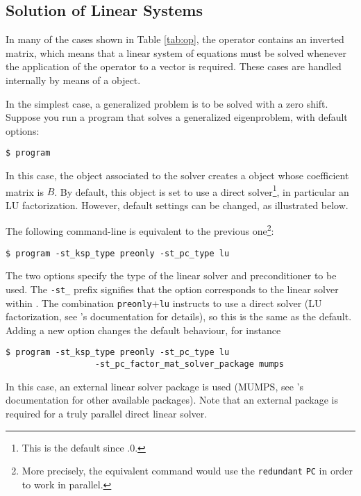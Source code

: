 \subsection{Solution of Linear Systems}
\label{sec:lin}

	In many of the cases shown in Table \ref{tab:op}, the operator contains an inverted matrix, which means that a linear system of equations must be solved whenever the application of the operator to a vector is required. These cases are handled internally by means of a  object.

	In the simplest case, a generalized problem is to be solved with a zero shift. Suppose you run a program that solves a generalized eigenproblem, with default options:
\begin{Verbatim}[fontsize=\small]
	$ program
\end{Verbatim}
In this case, the  object associated to the  solver creates a  object whose coefficient matrix is $B$. By default, this  object is set to use a direct solver\footnote{This is the default since .0.}, in particular an LU factorization. However, default settings can be changed, as illustrated below.

	The following command-line is equivalent to the previous one\footnote{More precisely, the equivalent command would use the \texttt{redundant} \texttt{PC} in order to work in parallel.}:
\begin{Verbatim}[fontsize=\small]
	$ program -st_ksp_type preonly -st_pc_type lu
\end{Verbatim}
The two options specify the type of the linear solver and preconditioner to be used. The \Verb!-st_! prefix signifies that the option corresponds to the linear solver within . The combination \texttt{preonly}$+$\texttt{lu} instructs to use a direct solver (LU factorization, see \petsc's documentation for details), so this is the same as the default. Adding a new option changes the default behaviour, for instance
\begin{Verbatim}[fontsize=\small]
	$ program -st_ksp_type preonly -st_pc_type lu
                  -st_pc_factor_mat_solver_package mumps
\end{Verbatim}
In this case, an external linear solver package is used (MUMPS, see \petsc's documentation for other available packages). Note that an external package is required for a truly parallel direct linear solver.

